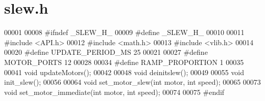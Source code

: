 \section{slew.\+h}
\label{slew_8h_source}

\begin{DoxyCode}
00001 
00008 \textcolor{preprocessor}{#ifndef \_SLEW\_H\_}
00009 \textcolor{preprocessor}{#define \_SLEW\_H\_}
00010 
00011 \textcolor{preprocessor}{#include <API.h>}
00012 \textcolor{preprocessor}{#include <math.h>}
00013 \textcolor{preprocessor}{#include <vlib.h>}
00014 
00020 \textcolor{preprocessor}{#define UPDATE\_PERIOD\_MS 25}
00021 
00027 \textcolor{preprocessor}{#define MOTOR\_PORTS 12}
00028 
00034 \textcolor{preprocessor}{#define RAMP\_PROPORTION 1}
00035 
00041 \textcolor{keywordtype}{void} updateMotors();
00042 
00048 \textcolor{keywordtype}{void} deinitslew();
00049 
00055 \textcolor{keywordtype}{void} init_slew();
00056 
00064 \textcolor{keywordtype}{void} set_motor_slew(\textcolor{keywordtype}{int} motor, \textcolor{keywordtype}{int} speed);
00065 
00073 \textcolor{keywordtype}{void} set_motor_immediate(\textcolor{keywordtype}{int} motor, \textcolor{keywordtype}{int} speed);
00074 
00075 \textcolor{preprocessor}{#endif}
\end{DoxyCode}
